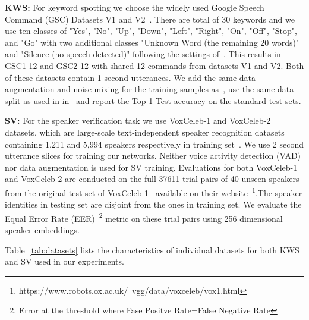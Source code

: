 \documentclass{article}
\begin{document}
\noindent \textbf{KWS:} For keyword spotting we choose the widely used Google Speech Command (GSC) Datasets V1 and V2~\cite{warden2018speech}. 
There are total of 30 keywords and we use ten classes of "Yes", "No", "Up", "Down", "Left", "Right", "On", "Off", "Stop",
and "Go" with two additional classes "Unknown Word (the remaining 20 words)" and "Silence (no speech detected)" following the settings of~\cite{qualcommkwssota,seo2021wav2kws}.
This results in GSC1-12 and GSC2-12 with shared 12 commands from datasets V1 and V2. Both of these datasets contain 1 second utterances.
We add the same data augmentation and noise mixing for the training samples as~\cite{seo2021wav2kws}, use the same data-split as used in in~\cite{qualcommkwssota,warden2018speech,seo2021wav2kws} and report the Top-1 Test accuracy on the standard test sets.



\noindent \textbf{SV:} For the speaker verification task we use VoxCeleb-1 and VoxCeleb-2 datasets, which are large-scale text-independent speaker recognition datasets containing 1,211 and 5,994 speakers respectively in training set~\cite{voxcelebwildjournal,nagrani2017voxceleb}. We use 2 second utterance slices for training our networks. Neither voice activity detection (VAD) nor data augmentation is used for SV training. 
Evaluations for both VoxCeleb-1 and VoxCeleb-2 are conducted on the full 37611 trial pairs of 40 unseen speakers from the original test set of VoxCeleb-1~\cite{voxcelebwildjournal} available on their website~\footnote{https://www.robots.ox.ac.uk/~vgg/data/voxceleb/vox1.html}.The speaker identities in testing set are disjoint from the ones in training set. We evaluate the Equal Error Rate (EER)~\footnote{Error at the threshold where Fase Positve Rate=False Negative Rate} metric on these trial pairs using 256 dimensional speaker embeddings.

Table~\ref{tab:datasets} lists the characteristics of individual datasets for both KWS and SV used in our experiments. 
\end{document}
